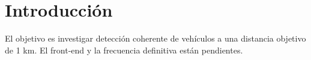 \section{Introducción} El objetivo es investigar detección coherente de vehículos a una distancia objetivo de 1 km. El front-end y la frecuencia definitiva están pendientes.
